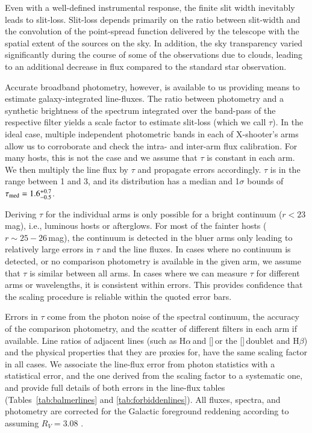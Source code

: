 \documentclass[traditabstract, longauth]{aa}
\newcommand{\hb}{H$\beta$}
\newcommand{\ha}{H$\alpha$}
\newcommand{\oiii}{[\ion{O}{iii}]}
\newcommand{\nii}{[\ion{N}{ii}]}
\begin{document}
Even with a well-defined instrumental response, the finite slit width inevitably leads to slit-loss. Slit-loss depends primarily on the ratio between slit-width and the convolution of the point-spread function delivered by the telescope with the spatial extent of the sources on the sky. In addition, the sky transparency varied significantly during the course of some of the observations due to clouds, leading to an additional decrease in flux compared to the standard star observation.

Accurate broadband photometry, however, is available to us providing means to estimate galaxy-integrated line-fluxes. The ratio between photometry and a synthetic brightness of the spectrum integrated over the band-pass of the respective filter yields a scale factor to estimate slit-loss (which we call $\tau$). In the ideal case, multiple independent photometric bands in each of X-shooter's arms allow us to corroborate and check the intra- and inter-arm flux calibration. For many hosts, this is not the case and we assume that $\tau$ is constant in each arm. We then multiply the line flux by $\tau$ and propagate errors accordingly. $\tau$ is in the range between 1 and 3, and its distribution has a median and 1$\sigma$ bounds of $\tau_{\rm {med}} = 1.6_{-0.5}^{+0.7}$. 

Deriving $\tau$ for the individual arms is only possible for a bright continuum ($r<23$\,mag), i.e., luminous hosts or afterglows. For most of the fainter hosts ($r\sim25-26$\,mag), the continuum is detected in the bluer arms only leading to relatively large errors in $\tau$ and the line fluxes. In cases where no continuum is detected, or no comparison photometry is available in the given arm, we assume that $\tau$ is similar between all arms. In cases where we can measure $\tau$ for different arms or wavelengths, it is consistent within errors. This provides confidence that the scaling procedure is reliable within the quoted error bars.

Errors in $\tau$ come from the photon noise of the spectral continuum, the accuracy of the comparison photometry, and the scatter of different filters in each arm if available. Line ratios of adjacent lines (such as \ha\,and \nii\,or the \oiii\,doublet and \hb) and the physical properties that they are proxies for, have the same scaling factor in all cases. We associate the line-flux error from photon statistics with a statistical error, and the one derived from the scaling factor to a systematic one, and provide full details of both errors in the line-flux tables (Tables~\ref{tab:balmerlines} and \ref{tab:forbiddenlines}). All fluxes, spectra, and photometry are corrected for the Galactic foreground reddening according to \citet{2011ApJ...737..103S} assuming $R_V=3.08$ \citep{1992ApJ...395..130P}.
\end{document}
